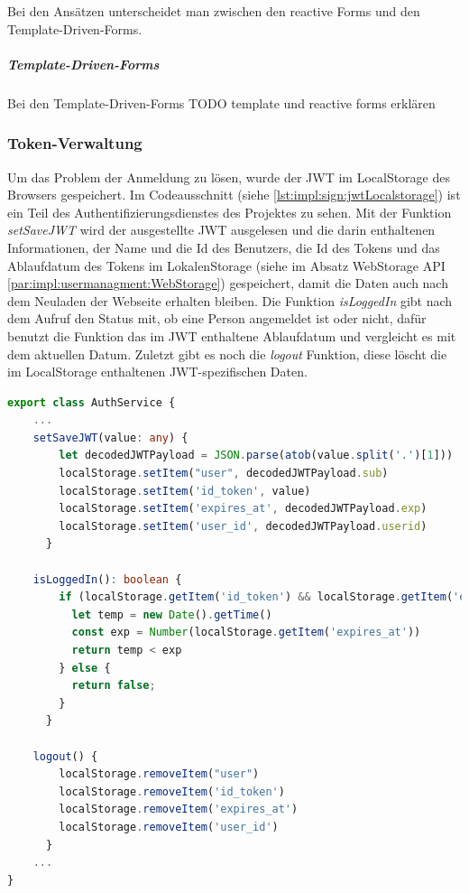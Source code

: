Bei den Ansätzen unterscheidet man zwischen den reactive Forms und den Template-Driven-Forms.

\subparagraph{Template-Driven-Forms}
Bei den Template-Driven-Forms 
TODO template und reactive forms erklären
\cite[Bookmonkey - 12 Formularverarbeitung und
Validierung: Iteration IV]{AngularBuch}

\subsubsection{Token-Verwaltung}
Um das Problem der Anmeldung zu lösen, wurde der JWT im LocalStorage des Browsers gespeichert. Im Codeausschnitt (siehe \ref{lst:impl:sign:jwtLocalstorage}) ist ein Teil des Authentifizierungsdienstes des Projektes zu sehen. Mit der Funktion \emph{setSaveJWT} wird der ausgestellte JWT ausgelesen und die darin enthaltenen Informationen, der Name und die Id des Benutzers, die Id des Tokens und das Ablaufdatum des Tokens im LokalenStorage (siehe im Absatz WebStorage API \ref{par:impl:usermanagment:WebStorage}) gespeichert, damit die Daten auch nach dem Neuladen der Webseite erhalten bleiben. Die Funktion \emph{isLoggedIn} gibt nach dem Aufruf den Status mit, ob eine Person angemeldet ist oder nicht, dafür benutzt die Funktion das im JWT enthaltene Ablaufdatum und vergleicht es mit dem aktuellen Datum. Zuletzt gibt es noch die \emph{logout} Funktion, diese löscht die im LocalStorage enthaltenen JWT-spezifischen Daten.

\begin{lstlisting}[caption=auth.service.ts - JWT und Localstorage,label=lst:impl:sign:jwtLocalstorage,language=TypeScript ]
export class AuthService {
    ...
    setSaveJWT(value: any) {
        let decodedJWTPayload = JSON.parse(atob(value.split('.')[1]))
        localStorage.setItem("user", decodedJWTPayload.sub)
        localStorage.setItem('id_token', value)
        localStorage.setItem('expires_at', decodedJWTPayload.exp)
        localStorage.setItem('user_id', decodedJWTPayload.userid)
      }

    isLoggedIn(): boolean {
        if (localStorage.getItem('id_token') && localStorage.getItem('expires_at')) {
          let temp = new Date().getTime()
          const exp = Number(localStorage.getItem('expires_at'))
          return temp < exp
        } else {
          return false;
        }
      }

    logout() {
        localStorage.removeItem("user")
        localStorage.removeItem('id_token')
        localStorage.removeItem('expires_at')
        localStorage.removeItem('user_id')
      }
    ...
}        
\end{lstlisting}


